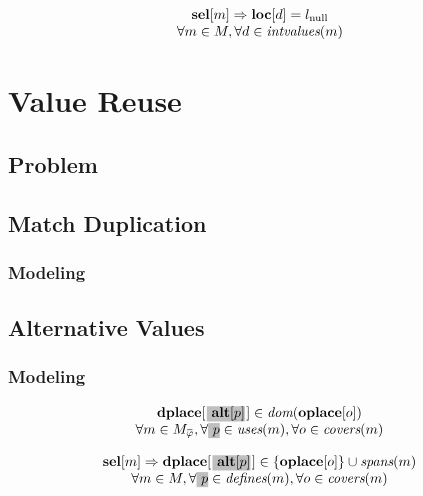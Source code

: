 \begin{equation}
  \begin{array}{c}
    \mVar{sel}[m]
    \mImp
    \mVar{loc}[d] = \mNullLocation \\
    \forall m \in \mMatchSet,
    \forall d \in \mIntValues(m)
  \end{array}
  \labelEquation{locs-of-intermediate-values}
\end{equation}



\section{Value Reuse}
\subsection{Problem}
\subsection{Match Duplication}
\subsubsection{Modeling}
\subsection{Alternative Values}
\subsubsection{Modeling}

\begin{equation}
  \begin{array}{c}
    \mVar{dplace}[\hlDiff{\mVar{alt}[p]}[1pt]] \in \mDom(\mVar{oplace}[o]) \\
    \forall m \in \mMatchCompSet{\mPhi},
    \forall \hlDiff{p} \in \mUses(m),
    \forall o \in \mCovers(m)
  \end{array}
  \labelEquation{dom-alt}
\end{equation}

\begin{equation}
  \begin{array}{c}
    \mVar{sel}[m]
    \mImp
    \mVar{dplace}[\hlDiff{\mVar{alt}[p]}[1pt]] \in
      \mSet{\mVar{oplace}[o]} \cup \mSpans(m) \\
    \forall m \in \mMatchSet,
    \forall \hlDiff{p} \in \mDefines(m),
    \forall o \in \mCovers(m)
  \end{array}
  \labelEquation{spanning-alt}
\end{equation}

